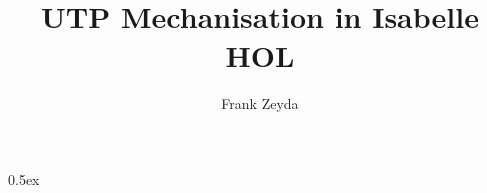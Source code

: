 \documentclass[11pt,a4paper]{article}
\begin{document}
\title{UTP Mechanisation in Isabelle HOL}

\author{Frank Zeyda}

\maketitle

\tableofcontents

\newpage

\parindent 0pt\parskip 0.5ex

%


\newpage

\newpage

\newpage

\newpage

\newpage

\newpage

\newpage

\newpage

\newpage

\newpage

\newpage

\newpage

\newpage

\newpage


%
%
\end{document}
